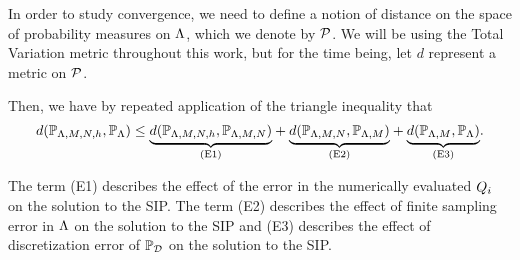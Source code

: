 In order to study convergence, we need to define a notion of distance on the space of probability measures on ${\Lambda}$, which we denote by $\mathcal{P}$.
We will be using the Total Variation metric throughout this work, but for the time being, let $d$ represent a metric on $\mathcal{P}$.

Then, we have by repeated application of the triangle inequality that
\begin{equation}
\label{eq:set-triangleineq}
d(\mathbb{P}_{{\Lambda}, M, N, h}, \operatorname*{\mathbb{P}_{{\Lambda}}}) \leq
\underset{ \text{(E1)} }{\underbrace{d(\mathbb{P}_{{\Lambda}, M, N, h},\mathbb{P}_{{\Lambda}, M, N})}} +
\underset{ \text{(E2)} }{\underbrace{d(\mathbb{P}_{{\Lambda}, M, N}, \mathbb{P}_{{\Lambda}, M}) }}+
\underset{ \text{(E3)} }{\underbrace{d(\mathbb{P}_{{\Lambda}, M}, \operatorname*{\mathbb{P}_{{\Lambda}}}) }}.
\end{equation}

The term (E1) describes the effect of the error in the numerically evaluated $Q_i$ on the solution to the SIP.
The term (E2) describes the effect of finite sampling error in ${\Lambda}$ on the solution to the SIP and (E3) describes the effect of discretization error of $\operatorname*{\mathbb{P}_{\mathcal{D}}}$ on the solution to the SIP.
